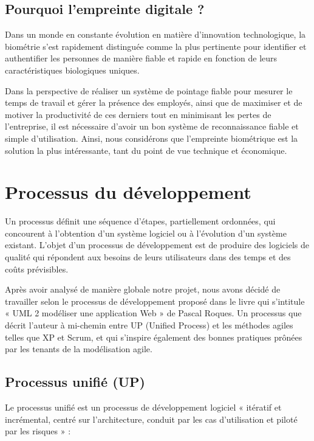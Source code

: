 \subsection{Pourquoi l’empreinte digitale ?}
Dans un monde en constante évolution en matière d’innovation technologique, la
biométrie s’est rapidement distinguée comme la plus pertinente pour identifier
et authentifier les personnes de manière fiable et rapide en fonction de leurs
caractéristiques biologiques uniques.

Dans la perspective de réaliser un système de pointage fiable pour mesurer le
temps de travail et gérer la présence des employés, ainsi que de maximiser et de
motiver la productivité de ces derniers tout en minimisant les pertes de
l’entreprise, il est nécessaire d’avoir un bon système de reconnaissance fiable
et simple d’utilisation. Ainsi, nous considérons que l’empreinte biométrique est
la solution la plus intéressante, tant du point de vue technique et économique. 

\section{Processus du développement}
Un processus définit une séquence d’étapes, partiellement ordonnées, qui
concourent à l’obtention d’un système logiciel ou à l’évolution d’un système
existant. L’objet d’un processus de développement est de produire des logiciels
de qualité qui répondent aux besoins de leurs utilisateurs dans des temps et des
coûts prévisibles. \cite{5}

Après avoir analysé de manière globale notre projet, nous avons décidé de
travailler selon le processus de développement proposé dans le livre qui
s’intitule « UML 2 modéliser une application Web » de Pascal Roques. Un
processus que décrit l’auteur à mi-chemin entre UP (Unified Process) et les
méthodes agiles telles que XP et Scrum, et qui s’inspire également des bonnes
pratiques prônées par les tenants de la modélisation agile.

\subsection{Processus unifié (UP)}
Le processus unifié est un processus de développement logiciel « itératif et
incrémental, centré sur l’architecture, conduit par les cas d’utilisation et
piloté par les risques » :
    
